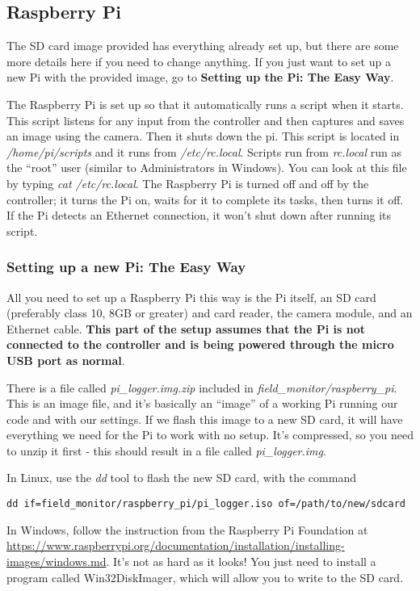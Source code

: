 \documentclass[10pt]{article}
\begin{document}
\subsection{Raspberry Pi}
The SD card image provided has everything already set up, but there are some more details here if you need to change anything. If you just want to set up a new Pi with the
provided image, go to \textbf{Setting up the Pi: The Easy Way}.

The Raspberry Pi is set up so that it automatically runs a script when it starts. This script listens for any input from the controller and then captures and saves an image using the camera. Then it shuts down the pi. This script is located in \textit{/home/pi/scripts} and it runs from \textit{/etc/rc.local}. Scripts run from \textit{rc.local} run as the ``root'' user (similar to Administrators in Windows). You can look at this file by typing \textit{cat /etc/rc.local}. The Raspberry Pi is turned off and off by the controller; it turns the Pi on, waits for it to complete its tasks, then turns it off. If the Pi detects an Ethernet connection, it won't shut down after running its script.

\subsubsection{Setting up a new Pi: The Easy Way}
All you need to set up a Raspberry Pi this way is the Pi itself, an SD card (preferably class 10, 8GB or greater) and card reader, the camera module, and an Ethernet cable. \textbf{This part of the setup assumes that the Pi is not connected to the controller and is being powered through the micro USB port as normal}.

There is a file called \textit{pi\_logger.img.zip} included in \textit{field\_monitor/raspberry\_pi}. This is an image file, and it's basically an ``image'' of a working Pi running our code and with our settings. If we flash this image to a new SD card, it will have everything we need for the Pi to work with no setup. It's compressed, so you need to unzip it first - this should result in a file called \textit{pi\_logger.img}.

In Linux, use the \textit{dd} tool to flash the new SD card, with the command
\begin{verbatim}
dd if=field_monitor/raspberry_pi/pi_logger.iso of=/path/to/new/sdcard
\end{verbatim}

In Windows, follow the instruction from the Raspberry Pi Foundation at \url{https://www.raspberrypi.org/documentation/installation/installing-images/windows.md}. It's
not as hard as it looks! You just need to install a program called Win32DiskImager, which will allow you to write to the SD card.
\end{document}
